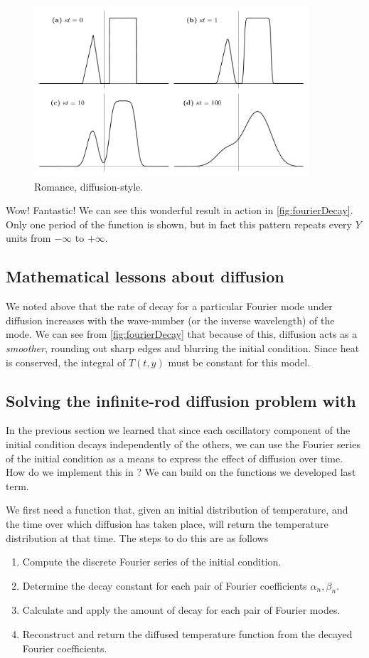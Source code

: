 \documentclass[11pt,twoside,a4paper]{article}
\begin{document}
\begin{figure}[ht]
  \centering
  \includegraphics[height=2.5in]{../figs/L18/decayFourierOscillations}
  \caption{Romance, diffusion-style.}
  \label{fig:fourierDecay}
\end{figure}

Wow! Fantastic!  We can see this wonderful result in action in
\autoref{fig:fourierDecay}. Only one period of the function is shown,
but in fact this pattern repeats every $Y$ units from $-\infty$ to
$+\infty$.

\subsection{Mathematical lessons about diffusion}

We noted above that the rate of decay for a particular Fourier mode
under diffusion increases with the wave-number (or the inverse
wavelength) of the mode.  We can see from \autoref{fig:fourierDecay}
that because of this, diffusion acts as a \textit{smoother}, rounding
out sharp edges and blurring the initial condition. Since heat is
conserved, the integral of $T(t,y)$ must be constant for this model.

\subsection{Solving the infinite-rod diffusion problem with \Mlab}

In the previous section we learned that since each oscillatory
component of the initial condition decays independently of the others,
we can use the Fourier series of the initial condition as a means to
express the effect of diffusion over time.  How do we implement this
in \Mlab? We can build on the functions we developed last term.

We first need a function that, given an initial distribution of
temperature, and the time over which diffusion has taken place, will
return the temperature distribution at that time.  The steps to do
this are as follows
\begin{enumerate}
\item Compute the discrete Fourier series of the initial condition.
\item Determine the decay constant for each pair of Fourier
  coefficients $\alpha_n,\beta_n$.
\item Calculate and apply the amount of decay for each pair of Fourier
  modes.
\item Reconstruct and return the diffused temperature function from
  the decayed Fourier coefficients.
\end{enumerate}
\end{document}

